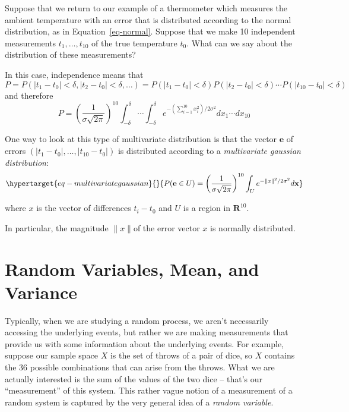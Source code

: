 \documentclass[
  11pt,
  letterpaper,
]{scrbook}
\theoremstyle{plain}
\theoremstyle{remark}
\begin{document}
Suppose that we return to our example of a thermometer which measures
the ambient temperature with an error that is distributed according to
the normal distribution, as in Equation~\ref{eq-normal}. Suppose that we
make 10 independent measurements \(t_1,\ldots, t_{10}\) of the true
temperature \(t_0\). What can we say about the distribution of these
measurements?

In this case, independence means that \[
P=P(|t_1-t_0|<\delta,|t_2-t_0|<\delta,\ldots) = P(|t_1-t_0|<\delta)P(|t_2-t_0|<\delta)\cdots P(|t_{10}-t_{0}|<\delta)
\] and therefore \[
P = \left(\frac{1}{\sigma\sqrt{2\pi}}\right)^{10}\int_{-\delta}^{\delta}\cdots\int_{-\delta}^{\delta}
e^{-(\sum_{i=1}^{10} x_i^2)/2\sigma^2} dx_1\cdots dx_{10}
\]

One way to look at this type of multivariate distribution is that the
vector \(\mathbf{e}\) of errors \((|t_1-t_0|,\ldots,|t_{10}-t_0|)\) is
distributed according to a \emph{multivariate gaussian distribution}:
\begin{equation}\protect\hypertarget{eq-multivariategaussian}{}{
P(\mathbf{e}\in U) =\left(\frac{1}{\sigma\sqrt{2\pi}}\right)^{10}\int_{U}
e^{-\|x\|^2/2\sigma^2} d\mathbf{x}
}\label{eq-multivariategaussian}\end{equation}

where \(x\) is the vector of differences \(t_{i}-t_{0}\) and \(U\) is a
region in \(\mathbf{R}^{10}\).

In particular, the magnitude \(\|x\|\)of the error vector \(x\) is
normally distributed.

\hypertarget{random-variables-mean-and-variance}{%
\section{Random Variables, Mean, and
Variance}\label{random-variables-mean-and-variance}}

Typically, when we are studying a random process, we aren't necessarily
accessing the underlying events, but rather we are making measurements
that provide us with some information about the underlying events. For
example, suppose our sample space \(X\) is the set of throws of a pair
of dice, so \(X\) contains the \(36\) possible combinations that can
arise from the throws. What we are actually interested is the sum of the
values of the two dice -- that's our ``measurement'' of this system.
This rather vague notion of a measurement of a random system is captured
by the very general idea of a \emph{random variable}.
\end{document}
